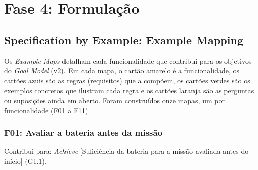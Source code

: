 \documentclass[a4paper, 12pt]{article}
\begin{document}
\section{Fase 4: Formulação}

\subsection{Specification by Example: Example Mapping}

Os \textit{Example Maps} detalham cada funcionalidade que contribui para os objetivos do \textit{Goal Model} (v2). Em cada mapa, o cartão amarelo é a funcionalidade, os cartões azuis são as regras (requisitos) que a compõem, os cartões verdes são os exemplos concretos que ilustram cada regra e os cartões laranja são as perguntas ou suposições ainda em aberto. Foram construídos onze mapas, um por funcionalidade (F01 a F11).

\Needspace{9cm}
\subsubsection{F01: Avaliar a bateria antes da missão}

Contribui para: \textit{Achieve} [Suficiência da bateria para a missão avaliada antes do início] (G1.1).
\end{document}

